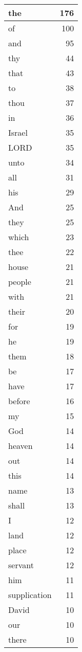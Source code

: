 \begin{center}
\begin{longtable}{l|r}
\hline \hline
\endlastfoot
the & 176 \\ \hline
of & 100 \\ \hline
and & 95 \\ \hline
thy & 44 \\ \hline
that & 43 \\ \hline
to & 38 \\ \hline
thou & 37 \\ \hline
in & 36 \\ \hline
Israel & 35 \\ \hline
LORD & 35 \\ \hline
unto & 34 \\ \hline
all & 31 \\ \hline
his & 29 \\ \hline
And & 25 \\ \hline
they & 25 \\ \hline
which & 23 \\ \hline
thee & 22 \\ \hline
house & 21 \\ \hline
people & 21 \\ \hline
with & 21 \\ \hline
their & 20 \\ \hline
for & 19 \\ \hline
he & 19 \\ \hline
them & 18 \\ \hline
be & 17 \\ \hline
have & 17 \\ \hline
before & 16 \\ \hline
my & 15 \\ \hline
God & 14 \\ \hline
heaven & 14 \\ \hline
out & 14 \\ \hline
this & 14 \\ \hline
name & 13 \\ \hline
shall & 13 \\ \hline
I & 12 \\ \hline
land & 12 \\ \hline
place & 12 \\ \hline
servant & 12 \\ \hline
him & 11 \\ \hline
supplication & 11 \\ \hline
David & 10 \\ \hline
our & 10 \\ \hline
there & 10 \\ \hline

\end{longtable}
\end{center}
